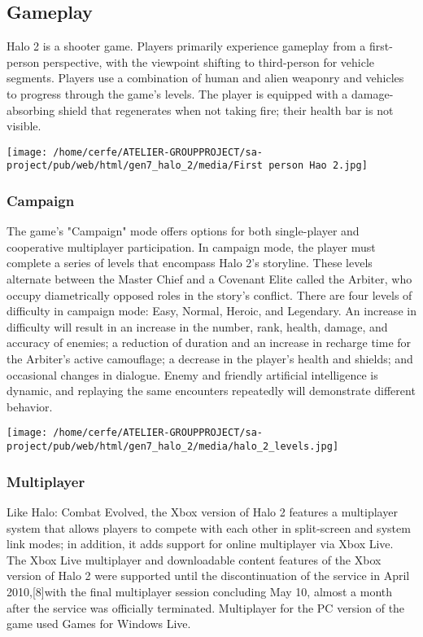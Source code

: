 \documentclass[a4paper,10pt]{book}
\begin{document}
 
 \subsection{ Gameplay }
 
          Halo 2 is a shooter game. Players primarily experience gameplay from a first-person perspective, with the viewpoint shifting to third-person for vehicle segments.
          Players use a combination of human and alien weaponry and vehicles to progress through the game's levels. The player is equipped with a damage-absorbing shield that
          regenerates when not taking fire; their health bar is not visible.
         
 \texttt{[image: /home/cerfe/ATELIER-GROUPPROJECT/sa-project/pub/web/html/gen7\_halo\_2/media/First person Hao 2.jpg]}
 
 \subsubsection{ Campaign }
 
          The game's "Campaign" mode offers options for both single-player and cooperative multiplayer participation. In campaign mode, the player must complete a series of levels that encompass Halo 2's storyline.
          These levels alternate between the Master Chief and a Covenant Elite called the Arbiter, who occupy diametrically opposed roles in the story's conflict. 
          There are four levels of difficulty in campaign mode: Easy, Normal, Heroic, and Legendary. An increase in difficulty will result in an increase in the number, rank, health, damage, and accuracy of enemies;
          a reduction of duration and an increase in recharge time for the Arbiter's active camouflage; a decrease in the player's health and shields; and occasional changes in dialogue.
          Enemy and friendly artificial intelligence is dynamic, and replaying the same encounters repeatedly will demonstrate different behavior.
         
 \texttt{[image: /home/cerfe/ATELIER-GROUPPROJECT/sa-project/pub/web/html/gen7\_halo\_2/media/halo\_2\_levels.jpg]}
 
 \subsubsection{Multiplayer }
 
          Like Halo: Combat Evolved, the Xbox version of Halo 2 features a multiplayer system that allows players to compete with each other in split-screen and system link modes; in addition, it adds support for online multiplayer via Xbox Live.
          The Xbox Live multiplayer and downloadable content features of the Xbox version of Halo 2 were supported until the discontinuation of the service in April 2010,[8]with the final multiplayer session concluding May 10, almost a month after the service was officially terminated.
          Multiplayer for the PC version of the game used Games for Windows  Live.
         
\end{document}
